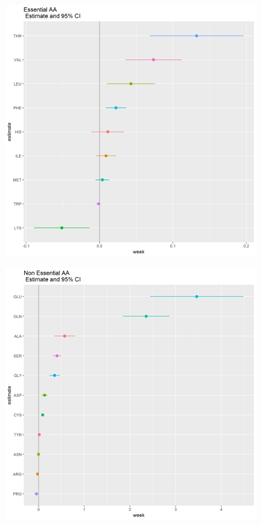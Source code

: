 \documentclass[12pt]{article}
\begin{document}
\begin{figure}[ht]\label{fig:EAA_W_coeff}
  \includegraphics[width= \textwidth]{../week/EAA_W_coeff.png}
  \caption{}
\end{figure}

\begin{figure}[ht]\label{fig:NEAA_W_coeff}
  \includegraphics[width= \textwidth]{../week/NEAA_W_coeff.png}
  \caption{}
\end{figure}
\end{document}
